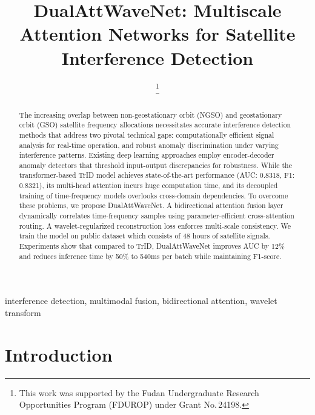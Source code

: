 \documentclass[conference]{IEEEtran}
\begin{document}
\title{DualAttWaveNet: Multiscale Attention Networks for Satellite Interference Detection}

\author{
    \thanks{This work was supported by the Fudan Undergraduate Research Opportunities Program (FDUROP) under Grant No.\,24198.}
}




\maketitle

\begin{abstract}
    The increasing overlap between non-geostationary orbit (NGSO) and geostationary orbit (GSO) satellite frequency allocations necessitates accurate interference detection methods that address two pivotal technical gaps: computationally efficient signal analysis for real-time operation, and robust anomaly discrimination under varying interference patterns.  Existing deep learning approaches employ encoder-decoder anomaly detectors that threshold input-output discrepancies for robustness. While the transformer-based TrID model achieves state-of-the-art performance (AUC: 0.8318, F1: 0.8321), its multi-head attention incurs huge computation time, and its decoupled training of time-frequency models overlooks cross-domain dependencies. To overcome these problems, we propose DualAttWaveNet. A bidirectional attention fusion layer dynamically correlates time-frequency samples using parameter-efficient cross-attention routing. A wavelet-regularized reconstruction loss enforces multi-scale consistency.  We train the model on public dataset which consists of 48 hours of satellite signals. Experiments show that compared to TrID, DualAttWaveNet improves AUC by 12\% and reduces inference time by 50\% to 540ms per batch while maintaining F1-score.
\end{abstract}

\begin{IEEEkeywords}
    interference detection, multimodal fusion, bidirectional attention, wavelet transform
\end{IEEEkeywords}


\section{Introduction}
\label{sec:intro}
\end{document}

